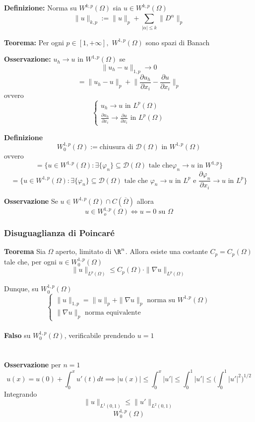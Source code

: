 \begin{tcolorbox}
	\textbf{Definizione:} Norma su $W^{k,p}(\Omega)$ sia $u\in W^{k,p}(\Omega)$ 
	\[\|u\|_{k,p}:=\|u\|_p+\sum_{|\alpha|\le k}^{}\|D^\alpha\|_p \]
\end{tcolorbox}
\begin{tcolorbox}
	\textbf{Teorema: }Per ogni $p\in [1,+\infty],$ $W^{1,p}(\Omega)$ sono spazi di Banach
\end{tcolorbox}
\textbf{Osservazione:} $u_h\to u$ in $W^{1,p}(\Omega)$ se
\[\|u_h-u\|_{1,p}\to 0\]\[=\|u_h-u\|_p+\bigg\| \frac{\partial u_h}{\partial x_i} -\frac{\partial u}{\partial x_i} \bigg\|_p\]
ovvero
\[\begin{cases}
	u_h\to u\text{ in }L^{p}(\Omega)\\
\frac{\partial u_h}{\partial x_i} \to \frac{\partial u}{\partial x_i} \text{ in }L^{p}(\Omega)
\end{cases}\]

\begin{tcolorbox}
\textbf{Definizione}
\[W_0^{1,p}(\Omega):=\text{chiusura di }\mathcal D(\Omega)\text{ in }W^{1,p}(\Omega)\]
ovvero
\[=\{u\in W^{1,p}(\Omega):\exists \{\varphi_n\}\subseteq  \mathcal D(\Omega)\text{ tale che}\varphi_n\to u\text{ in }W^{1,p} \}\]
\[=\{u\in W^{1,p}(\Omega):\exists \{\varphi_n\} \subseteq  \mathcal D(\Omega)\text{ tale che }\varphi_n\to u \text{ in }L^{p}\text{ e }\frac{\partial \varphi_n}{\partial x_i} \to u\text{ in }L^{p}\}\]
\end{tcolorbox}
\textbf{Osservazione} 
Se $u\in W^{1,p}(\Omega)\cap C(\overline\Omega)$ allora 
\[u\in W_o^{1,p}(\Omega) \iff u=0\text{ su }\Omega\]
\subsubsection{Disuguaglianza di Poincaré}
\begin{tcolorbox}
\textbf{Teorema}
Sia $\Omega$ aperto, limitato di $\R^n$. Allora esiste una costante $C_p=C_p(\Omega)$ tale che, per ogni $u\in W_0^{1,p}(\Omega)$ 
\[\|u\|_{L^{p}(\Omega)}\le C_p(\Omega)\cdot \|\nabla u\|_{L^{p}(\Omega)}\]
\end{tcolorbox}

Dunque, su $W_0^{1,p}(\Omega)$
\[\begin{cases}
	\|u\|_{1,p}=\|u\|_p+\|\nabla u\|_p\text{  norma su }W^{1,p}(\Omega)
\\\|\nabla u\|_p\text{  norma equivalente}
\end{cases}\]
\\\textbf{Falso }su $W_0^{1,p}(\Omega)$, verificabile prendendo $u=1$ 
\\\divider\\
\\\textbf{Osservazione} per $n=1$ 
\[u(x)=u(0)+\int_{0}^{x} u'(t)dt\implies |u(x)|\le \int_{0}^{x} |u'|\le \int_{0}^{1} |u'|\le \bigg(\int_{0}^{1} |u'|^2\bigg)^{1 / 2}\]
Integrando 
\[\|u\|_{L^{1}(0,1)}\le \|u'\|_{L^{2}(0,1)}\]
\[W_0^{1,p}(\Omega)\]
